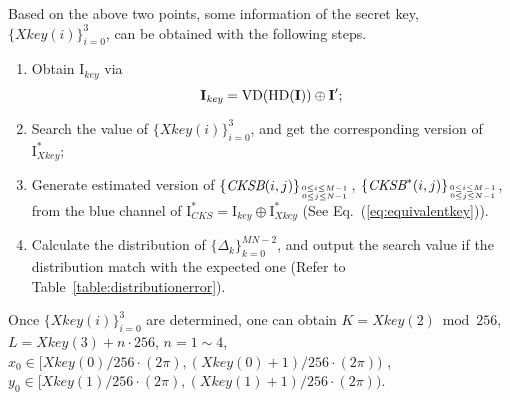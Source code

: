 \documentclass[twocolumn]{svjour3}
\newcommand\mymatrix[1]{\bm{\mathrm{#1}}}
\newcommand\Xkey{\textit{Xkey}}
\newcommand\CKS{\textit{CKS}}
\newcommand\key{\textit{key}}
\newcommand\HD{\textup{HD}}
\newcommand\VD{\textup{VD}}
\begin{document}
Based on the above two points, some information of the secret key, $\{\textit{Xkey}(i)\}_{i=0}^3$, can be obtained with the following steps.
\begin{enumerate}
\item Obtain $\mymatrix{I}_{\key}$ via
\begin{equation*}
\mymatrix{I}_{\key}= \VD(\HD(\mymatrix{I}))\oplus \mymatrix{I}';
\end{equation*}

\item Search the value of $\{\textit{Xkey}(i)\}_{i=0}^3$, and get the corresponding version of $\mymatrix{I}_{\Xkey}^*$;

\item Generate estimated version of $\{\textit{CKSB}(i,j)\}_{0\leq i\leq M-1 \atop 0\leq j\leq N-1}$,
$\{\textit{CKSB}^*(i,j)\}_{0\leq i\leq M-1 \atop 0\leq j\leq N-1}$, from the blue channel of
$\mymatrix{I}^*_{\CKS}=\mymatrix{I}_{\key}\oplus\mymatrix{I}_{\Xkey}^*$ (See Eq.~(\ref{eq:equivalentkey})).

\item Calculate the distribution of $\{\Delta_k\}_{k=0}^{MN-2}$, and output the search value if the distribution match with the expected one (Refer to Table~\ref{table:distributionerror}).
\end{enumerate}

Once $\{\textit{Xkey}(i)\}_{i=0}^3$ are determined, one can obtain $K=\textit{Xkey}(2)\bmod 256$, $L=\textit{Xkey}(3)+n\cdot 256$, $n=1\sim 4$, $x_0\in [\textit{Xkey}(0)/256\cdot(2\pi), (\textit{Xkey}(0)+1)/256\cdot(2\pi))$
, $y_0\in [\textit{Xkey}(1)/256\cdot(2\pi), (\textit{Xkey}(1)+1)/256\cdot(2\pi))$.
\end{document}
